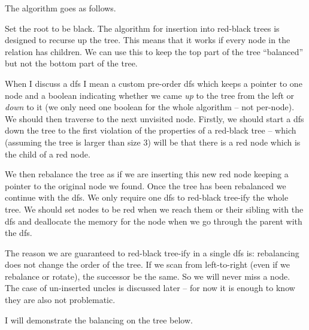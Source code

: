 \documentclass[10pt,\jkfside,a4paper]{article}
\begin{document}
\begin{enumerate}
\begin{enumerate}
The algorithm goes as follows.

Set the root to be black. The algorithm for insertion into red-black trees is designed to 
recurse up the tree. This means that it works if every node in the relation has children. We can use this to 
keep the top part of the tree ``balanced'' but not the bottom part of the tree.

When I discuss a dfs I mean a custom pre-order dfs which keeps a pointer to one node and a boolean indicating 
whether we came \textit{up} to the tree from 
the left or \textit{down} to it (we only need one boolean for the whole algorithm -- not per-node). We should 
then traverse to the next unvisited node. Firstly, we should start a dfs down the tree to the first violation 
of the properties of a red-black tree -- which (assuming the tree is larger than size 3) will be that 
there is a red node which is the child of a red node.

We then rebalance the tree as if we are inserting this new red node keeping a pointer to the original node we 
found. Once the tree has been rebalanced we continue with the dfs. We only require one dfs to red-black tree-ify 
the whole tree. We should set nodes to be red when we reach them or their sibling with the dfs and deallocate the 
memory for the node when we go through the parent with the dfs.

The reason we are guaranteed to red-black tree-ify in a single dfs is: rebalancing does not change the order of the 
tree. If we scan from left-to-right (even if we rebalance or rotate), the successor be the same. So we will never miss 
a node. The case of un-inserted uncles is discussed later -- for now it is enough to know they are also not problematic.

I will demonstrate the balancing on the tree below.


\end{enumerate}
\end{enumerate}
\end{document}
